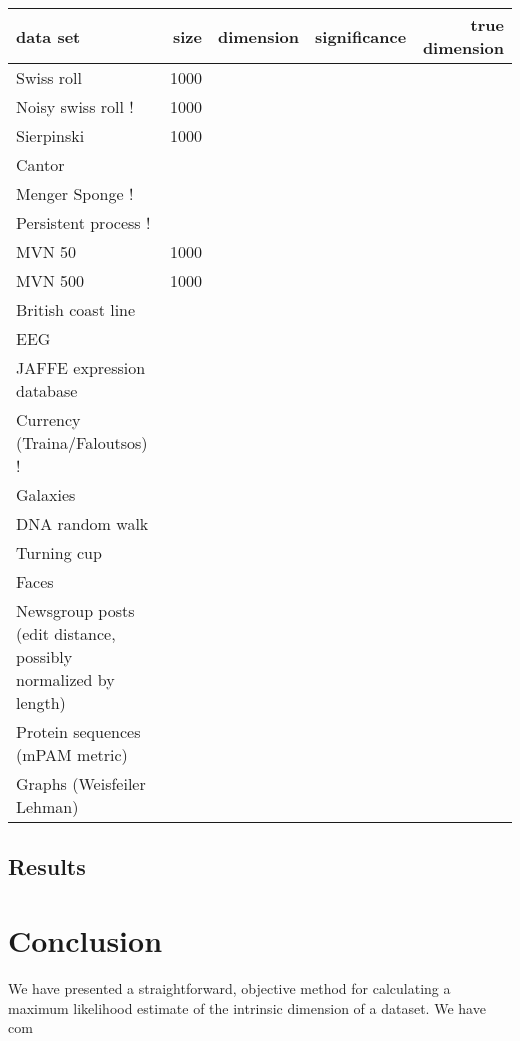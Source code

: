 \documentclass{article}
\begin{document}
\pagebreak
\begin{landscape}

\begin{tabular}{l | r r r r}
\hline
data set & size & dimension & significance & true dimension \\
\hline
Swiss roll & 1000 & & & \\
Noisy swiss roll ! & 1000 & & & \\ 
Sierpinski & 1000 & & & \\
Cantor & & & & \\
Menger Sponge ! & & & & \\
Persistent process ! & & & & \\
  
MVN 50 & 1000 & & & \\ 
MVN 500 & 1000 & & & \\
 
British coast line & & & & \\
   
EEG & & & & \\
JAFFE expression database & & & & \\
Currency (Traina/Faloutsos) ! & & & & \\
Galaxies & & & & \\
DNA random walk & & & & \\
Turning cup & & & & \\ 
Faces & & & & \\ 

Newsgroup posts (edit distance, possibly normalized by length) & & & & \\
Protein sequences (mPAM metric) & & & & \\
Graphs (Weisfeiler Lehman) & & & & \\
\hline
\end{tabular}

\end{landscape}
\pagebreak

\subsection{Results}

\section{Conclusion}

We have presented a straightforward, objective method for calculating a maximum likelihood estimate of the intrinsic dimension of a dataset. We have com 
\end{document}
